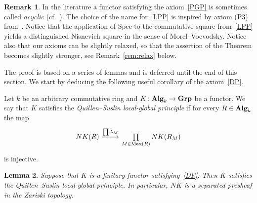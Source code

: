 \documentclass[oneside, 11pt]{amsart} \pdfoutput=1
\newcommand{\Max}{\mathrm{Max}}
\numberwithin{equation}{section}
\newtheorem{lemma}{Lemma} \numberwithin{lemma}{section}
\theoremstyle{definition}
\newtheorem{rem}[lemma]{Remark}
\newcommand{\catname}[1]{{\normalfont\textbf{#1}}} %
\begin{document}
\begin{rem}
 In the literature a functor satisfying the axiom~\ref{PGP} is sometimes called {\it acyclic} (cf.~\cite[Def.~III.4.1.1]{Kbook}).
The choice of the name for~\eqref{LPP} is inspired by axiom (P3) from~\cite[Proposition~3.3.4]{AHW18}. Notice that the application of $\mathrm{Spec}$ to the commutative square from~\ref{LPP} yields a distinguished Nisnevich square in the sense of Morel--Voevodsky. Notice also that our axioms can be slightly relaxed, so that the assertion of the Theorem becomes slightly stronger, see Remark~\ref{rem:relax} below.
\end{rem}

The proof is based on a series of lemmas and is deferred until the end of this section. We start by deducing the following useful corollary of the axiom~\ref{DP}. 

Let $k$ be an arbitrary commutative ring and $K\colon \catname{Alg}_k \to \catname{Grp}$ be a functor.
We say that $K$ satisfies the {\it Quillen--Suslin local-global principle} if for every $R\in \catname{Alg}_k$ the map 
\begin{equation} \label{QS-def} \begin{tikzcd} NK(R) \ar{r}{\prod \lambda_M} & \prod\limits_{M \in \Max(R)} NK(R_M) \end{tikzcd} \end{equation} is injective.
\begin{lemma}\label{LGP}
Suppose that $K$ is a finitary functor satisfying~\ref{DP}. Then $K$ satisfies the Quillen--Suslin local-global principle. In particular, $NK$ is a separated presheaf in the Zariski topology.
\end{lemma}
\end{document}
